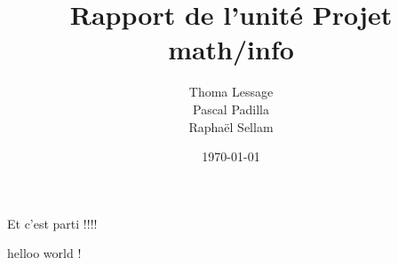 \documentclass[10pt]{article}
\title{Rapport de l'unité Projet math/info}
\author{    Thoma Lessage\\
            Pascal Padilla\\
            Raphaël Sellam
    }
\date{\today}
\begin{document}
\pagecolor{orangeamu!25}
\maketitle\thispagestyle{empty}


\newpage\pagecolor{orangeamu!10}
\tableofcontents

\newpage

\nopagecolor

Et c'est parti !!!!

helloo world !
\end{document}
